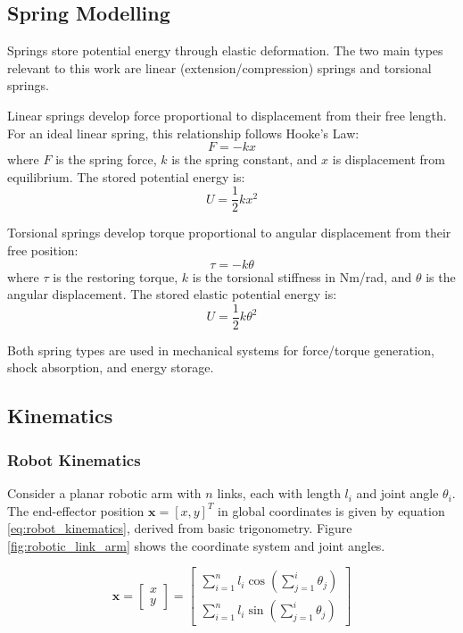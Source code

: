 \subsection{Spring Modelling}
\label{sec:spring_theory}
Springs store potential energy through elastic deformation. The two main types relevant to this work are linear (extension/compression) springs and torsional springs.

Linear springs develop force proportional to displacement from their free length. For an ideal linear spring, this relationship follows Hooke's Law:
\begin{equation}
    F = -kx
\end{equation}
where $F$ is the spring force, $k$ is the spring constant, and $x$ is displacement from equilibrium. The stored potential energy is:
\begin{equation}
    U = \frac{1}{2}kx^2
\end{equation}

Torsional springs develop torque proportional to angular displacement from their free position:
\begin{equation}
    \tau = -k\theta
\end{equation}
where $\tau$ is the restoring torque, $k$ is the torsional stiffness in Nm/rad, and $\theta$ is the angular displacement. The stored elastic potential energy is:
\begin{equation}
    U = \frac{1}{2}k\theta^2
\end{equation} 

Both spring types are used in mechanical systems for force/torque generation, shock absorption, and energy storage.

\subsection{Kinematics}
    \subsubsection{Robot Kinematics}
    \label{sec:robot_kinematics}
Consider a planar robotic arm with $n$ links, each with length $l_i$ and joint angle $\theta_i$. The end-effector position $\bm{x} = [x, y]^T$ in global coordinates is given by equation \ref{eq:robot_kinematics}, derived from basic trigonometry. Figure \ref{fig:robotic_link_arm} shows the coordinate system and joint angles.

\begin{equation}
    \label{eq:robot_kinematics}
    \bm{x} = \begin{bmatrix}
        x \\
        y
    \end{bmatrix} = \begin{bmatrix}
        \sum_{i=1}^{n} l_i \cos\left(\sum_{j=1}^{i} \theta_j\right) \\
        \sum_{i=1}^{n} l_i \sin\left(\sum_{j=1}^{i} \theta_j\right)
    \end{bmatrix}
\end{equation}

